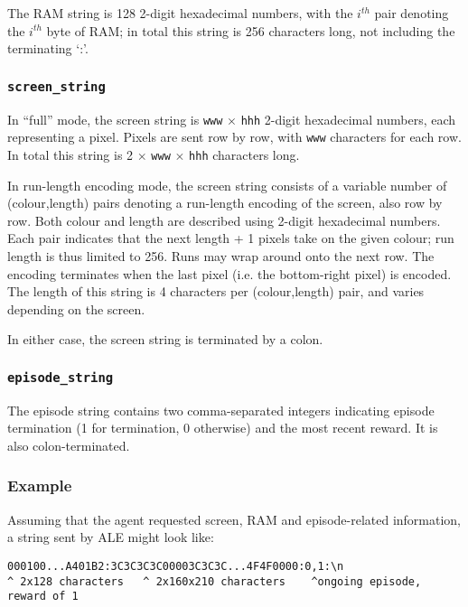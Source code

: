 \documentclass[12pt]{article}
\begin{document}
The RAM string is 128 2-digit hexadecimal numbers, with the $i^{th}$ pair denoting the
$i^{th}$ byte of RAM; in total this string is 256 characters long, not including the terminating
`:'.

\subsubsection{\texttt{screen\_string}}

In ``full'' mode, the screen string is \texttt{www} $\times$ \texttt{hhh} 2-digit hexadecimal numbers, each representing a pixel. Pixels are sent row by row, with \texttt{www} characters for each row. In total this string is 2 $\times$ \texttt{www} $\times$ \texttt{hhh} characters long.

In run-length encoding mode, the screen string consists of a variable number of (colour,length) pairs denoting a run-length encoding of the screen, also row by row. Both colour and length are described using 2-digit hexadecimal numbers. Each pair indicates that the next length + 1 pixels take on the given colour; run length is thus limited to 256. Runs may wrap around onto the next row. The encoding terminates when the last pixel (i.e. the bottom-right pixel) is encoded. The length of this string is 4 characters per (colour,length) pair, and varies depending on the screen.

In either case, the screen string is terminated by a colon.

\subsubsection{\texttt{episode\_string}}

The episode string contains two comma-separated integers indicating episode termination (1 for
termination, 0 otherwise) and the most recent reward. It is also colon-terminated.

\subsubsection{Example}

Assuming that the agent requested screen, RAM and episode-related information, a string sent by ALE might look like:

\begin{verbatim}
000100...A401B2:3C3C3C3C00003C3C3C...4F4F0000:0,1:\n
^ 2x128 characters   ^ 2x160x210 characters    ^ongoing episode, reward of 1
\end{verbatim}
\end{document}
